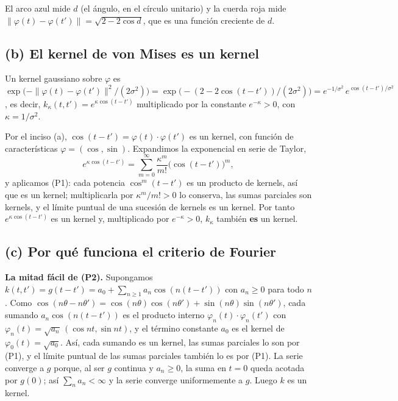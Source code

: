 El arco azul mide $d$ (el ángulo, en el círculo unitario) y la cuerda roja mide
$\|\varphi(t)-\varphi(t')\|=\sqrt{2-2\cos d}$, que es una función creciente de
$d$.

\subsection*{(b) El kernel de von Mises es un kernel}

Un kernel gaussiano sobre $\varphi$ es
$\exp\bigl(-\|\varphi(t)-\varphi(t')\|^2/(2\sigma^2)\bigr)
=\exp\bigl(-(2-2\cos(t-t'))/(2\sigma^2)\bigr)
=e^{-1/\sigma^2}\,e^{\cos(t-t')/\sigma^2}$,
es decir, $k_\kappa(t,t')=e^{\kappa\cos(t-t')}$ multiplicado por la constante
$e^{-\kappa}>0$, con $\kappa=1/\sigma^2$.

Por el inciso (a), $\cos(t-t')=\varphi(t)\cdot\varphi(t')$ es un kernel, con
función de características $\varphi=(\cos,\sin)$. Expandimos la exponencial en
serie de Taylor,
\[
e^{\kappa\cos(t-t')}
=\sum_{m=0}^{\infty}\frac{\kappa^m}{m!}\bigl(\cos(t-t')\bigr)^m,
\]
y aplicamos (P1): cada potencia $\cos^m(t-t')$ es un producto de kernels, así
que es un kernel; multiplicarla por $\kappa^m/m!>0$ lo conserva, las sumas
parciales son kernels, y el límite puntual de una sucesión de kernels es un
kernel. Por tanto $e^{\kappa\cos(t-t')}$ es un kernel y, multiplicado por
$e^{-\kappa}>0$, $k_\kappa$ también \textbf{es} un kernel.

\subsection*{(c) Por qué funciona el criterio de Fourier}

\textbf{La mitad fácil de (P2).} Supongamos $k(t,t')=g(t-t')=a_0+\sum_{n\ge1}a_n\cos(n(t-t'))$
con $a_n\ge0$ para todo $n$. Como
$\cos(n\theta-n\theta')=\cos(n\theta)\cos(n\theta')+\sin(n\theta)\sin(n\theta')$,
cada sumando $a_n\cos(n(t-t'))$ es el producto interno
$\varphi_n(t)\cdot\varphi_n(t')$ con $\varphi_n(t)=\sqrt{a_n}\,(\cos nt,\sin nt)$,
y el término constante $a_0$ es el kernel de $\varphi_0(t)=\sqrt{a_0}$. Así,
cada sumando es un kernel, las sumas parciales lo son por (P1), y el límite
puntual de las sumas parciales también lo es por (P1). La serie converge a $g$
porque, al ser $g$ continua y $a_n\ge0$, la suma en $t=0$ queda acotada por
$g(0)$; así $\sum_n a_n<\infty$ y la serie converge uniformemente a $g$.
Luego $k$ es un kernel.

